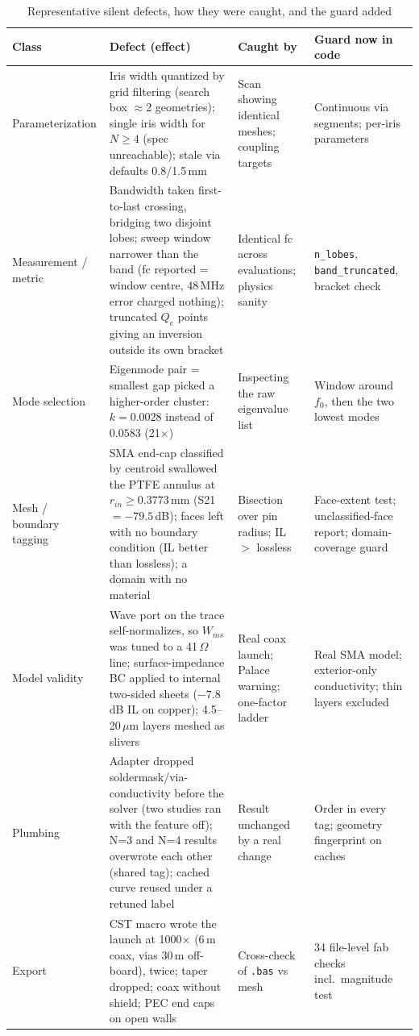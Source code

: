 \documentclass{ieeeaccess}
\begin{document}
\begin{table}[t]
\centering
\caption{Representative silent defects, how they were caught, and the guard added}
\label{tab:bugs}
\footnotesize
\begin{tabular}{p{2.3cm}p{6.2cm}p{4.2cm}p{3.6cm}}
\toprule
\textbf{Class} & \textbf{Defect (effect)} & \textbf{Caught by} & \textbf{Guard now in code}\\
\midrule
Parameterization & Iris width quantized by grid filtering (search box $\approx$2 geometries); single iris width for $N\ge4$ (spec unreachable); stale via defaults 0.8/1.5\,mm & Scan showing identical meshes; coupling targets & Continuous via segments; per-iris parameters \\
Measurement / metric & Bandwidth taken first-to-last crossing, bridging two disjoint lobes; sweep window narrower than the band (fc reported = window centre, 48\,MHz error charged nothing); truncated $Q_e$ points giving an inversion outside its own bracket & Identical fc across evaluations; physics sanity & \texttt{n\_lobes}, \texttt{band\_truncated}, bracket check \\
Mode selection & Eigenmode pair = smallest gap picked a higher-order cluster: $k=0.0028$ instead of $0.0583$ (21$\times$) & Inspecting the raw eigenvalue list & Window around $f_0$, then the two lowest modes \\
Mesh / boundary tagging & SMA end-cap classified by centroid swallowed the PTFE annulus at $r_{in}\ge0.3773$\,mm (S21 $=-79.5$\,dB); faces left with no boundary condition (IL better than lossless); a domain with no material & Bisection over pin radius; IL $>$ lossless & Face-extent test; unclassified-face report; domain-coverage guard \\
Model validity & Wave port on the trace self-normalizes, so $W_{ms}$ was tuned to a 41\,$\Omega$ line; surface-impedance BC applied to internal two-sided sheets ($-7.8$\,dB IL on copper); 4.5--20\,$\mu$m layers meshed as slivers & Real coax launch; Palace warning; one-factor ladder & Real SMA model; exterior-only conductivity; thin layers excluded \\
Plumbing & Adapter dropped soldermask/via-conductivity before the solver (two studies ran with the feature off); N=3 and N=4 results overwrote each other (shared tag); cached curve reused under a retuned label & Result unchanged by a real change & Order in every tag; geometry fingerprint on caches \\
Export & CST macro wrote the launch at 1000$\times$ (6\,m coax, vias 30\,m off-board), twice; taper dropped; coax without shield; PEC end caps on open walls & Cross-check of \texttt{.bas} vs mesh & 34 file-level fab checks incl.\ magnitude test \\

\end{tabular}
\end{table}
\end{document}
